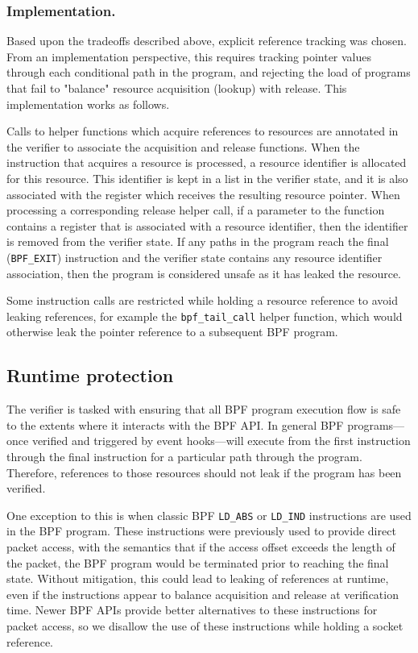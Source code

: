 \documentclass[10pt,sigconf,authorversion]{lpc}
\begin{document}
\subsubsection{Implementation.}

Based upon the tradeoffs described above, explicit reference tracking was
chosen. From an implementation perspective, this requires tracking pointer
values through each conditional path in the program, and rejecting the load of
programs that fail to "balance" resource acquisition (lookup) with release.
This implementation works as follows.

Calls to helper functions which acquire references to resources are annotated
in the verifier to associate the acquisition and release functions. When the
instruction that acquires a resource is processed, a resource identifier is
allocated for this resource. This identifier is kept in a list in the verifier
state, and it is also associated with the register which receives the resulting
resource pointer. When processing a corresponding release helper call, if a
parameter to the function contains a register that is associated with a
resource identifier, then the identifier is removed from the verifier state. If
any paths in the program reach the final (\verb+BPF_EXIT+) instruction and the
verifier state contains any resource identifier association, then the program
is considered unsafe as it has leaked the resource.

Some instruction calls are restricted while holding a resource reference to
avoid leaking references, for example the \verb+bpf_tail_call+ helper function,
which would otherwise leak the pointer reference to a subsequent BPF program.

\subsection{Runtime protection}

The verifier is tasked with ensuring that all BPF program execution flow is
safe to the extents where it interacts with the BPF API. In general BPF
programs---once verified and triggered by event hooks---will execute from the
first instruction through the final instruction for a particular path through
the program. Therefore, references to those resources should not leak if the
program has been verified.

One exception to this is when classic BPF \verb+LD_ABS+ or \verb+LD_IND+
instructions are used in the BPF program. These instructions were previously
used to provide direct packet access, with the semantics that if the access
offset exceeds the length of the packet, the BPF program would be terminated
prior to reaching the final state. Without mitigation, this could lead to
leaking of references at runtime, even if the instructions appear to balance
acquisition and release at verification time. Newer BPF APIs provide better
alternatives to these instructions for packet access, so we disallow the use of
these instructions while holding a socket reference.
\end{document}
